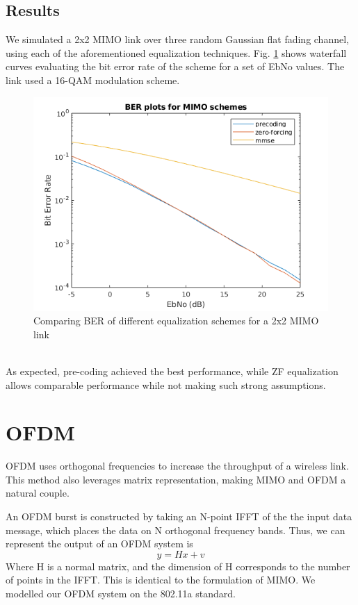 \documentclass[conference]{IEEEtran}
\begin{document}
\subsection{Results}
We simulated a 2x2 MIMO link over three random Gaussian flat fading channel, using each of the aforementioned equalization techniques. Fig. \ref{fig:mimo} shows waterfall curves evaluating the bit error rate of the scheme for a set of EbNo values. The link used a 16-QAM modulation scheme.
\begin{figure}[htbp]
\centerline{\includegraphics[scale=.4]{./media/mimo_01.png}}
\caption{Comparing BER of different equalization schemes for a 2x2 MIMO link}
\label{fig:mimo}
\end{figure}\\
As expected, pre-coding achieved the best performance, while ZF equalization allows comparable performance while not making such strong assumptions.
\section{OFDM}
OFDM uses orthogonal frequencies to increase the throughput of a wireless link. This method also leverages matrix representation, making MIMO and OFDM a natural couple. 

An OFDM burst is constructed by taking an N-point IFFT of the the input data message, which places the data on N orthogonal frequency bands. Thus, we can represent the output of an OFDM system is 
\begin{equation}
y = Hx + v
\end{equation}
Where H is a normal matrix, and the dimension of H corresponds to the number of points in the IFFT. This is identical to the formulation of MIMO. We modelled our OFDM system on the 802.11a standard.
\end{document}
